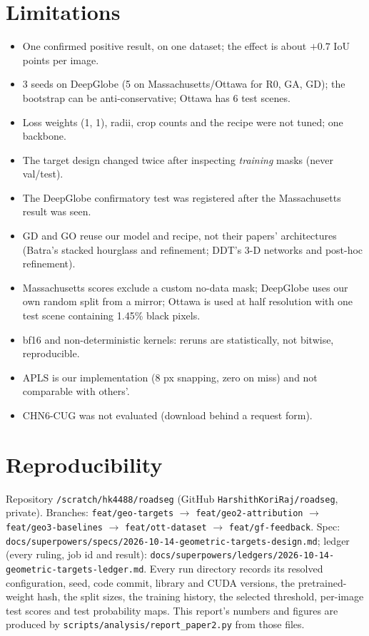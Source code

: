 \documentclass[11pt]{article}
\begin{document}
\section{Limitations}
\begin{itemize}
  \item One confirmed positive result, on one dataset; the effect is about $+0.7$ IoU points per image.
  \item 3 seeds on DeepGlobe (5 on Massachusetts/Ottawa for R0, GA, GD); the bootstrap can be
        anti-conservative; Ottawa has 6 test scenes.
  \item Loss weights (1, 1), radii, crop counts and the recipe were not tuned; one backbone.
  \item The target design changed twice after inspecting \emph{training} masks (never val/test).
  \item The DeepGlobe confirmatory test was registered after the Massachusetts result was seen.
  \item GD and GO reuse our model and recipe, not their papers' architectures (Batra's stacked
        hourglass and refinement; DDT's 3-D networks and post-hoc refinement).
  \item Massachusetts scores exclude a custom no-data mask; DeepGlobe uses our own random split from a
        mirror; Ottawa is used at half resolution with one test scene containing 1.45\% black pixels.
  \item bf16 and non-deterministic kernels: reruns are statistically, not bitwise, reproducible.
  \item APLS is our implementation (8 px snapping, zero on miss) and not comparable with others'.
  \item CHN6-CUG was not evaluated (download behind a request form).
\end{itemize}

\section{Reproducibility}
{\sloppy
Repository \texttt{/scratch/hk4488/roadseg} (GitHub \texttt{HarshithKoriRaj/roadseg}, private).
Branches: \texttt{feat/geo-targets} $\to$ \texttt{feat/geo2-attribution} $\to$
\texttt{feat/geo3-baselines} $\to$ \texttt{feat/ott-dataset} $\to$ \texttt{feat/gf-feedback}. Spec:
\texttt{docs/superpowers/specs/2026-10-14-geometric-targets-design.md}; ledger (every ruling, job id and
result): \texttt{docs/superpowers/ledgers/2026-10-14-geometric-targets-ledger.md}. Every run directory
records its resolved configuration, seed, code commit, library and CUDA versions, the pretrained-weight
hash, the split sizes, the training history, the selected threshold, per-image test scores and test
probability maps. This report's numbers and figures are produced by
\texttt{scripts/analysis/report\_paper2.py} from those files.\par}
\end{document}
